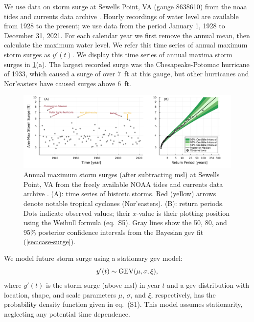 \documentclass{agujournal2019}
\begin{document}
We use data on storm surge at Sewells Point, VA (gauge 8638610) from the \gls{noaa} tides and currents data archive \cite{noaa_tidesandcurrents:2022}.
Hourly recordings of water level are available from 1928 to the present; we use data from the period January 1, 1928 to December 31, 2021.
For each calendar year we first remove the annual mean, then calculate the maximum water level.
We refer this time series of annual maximum storm surges as $y'(t)$.
We display this time series of annual maxima storm surges in \cref{fig:surge-obs-return}(a).
The largest recorded surge was the Chesapeake-Potomac hurricane of 1933, which caused a surge of over \SI{7}{ft} at this gauge, but other hurricanes and Nor'easters have caused surges above \SI{6}{ft}.

\begin{figure}
  \centering
  \includegraphics[width=\textwidth]{surge-obs-return}
  \caption{
    Annual maximum storm surges (after subtracting \acrlong{msl}) at Sewells Point, VA from the freely available NOAA tides and currents data archive \protect\cite{noaa_tidesandcurrents:2022}.
    (A):
    time series of historic storms.
    Red (yellow) arrows denote notable tropical cyclones (Nor'easters).
    (B):
    return periods.
    Dots indicate observed values; their $x$-value is their plotting position using the Weibull formula (eq.~S5).
    Gray lines show the 50, 80, and 95\% posterior confidence intervals from the Bayesian \gls{gev} fit (\cref{sec:case-surge}).
  }\label{fig:surge-obs-return}
\end{figure}

We model future storm surge using a stationary \gls{gev} model:
\begin{equation}\label{eq:surge-model}
  y'(t) \sim \text{GEV}\qty(\mu, \sigma, \xi),
\end{equation}
where $y'(t)$ is the storm surge (above \gls{msl}) in year $t$ and a \gls{gev} distribution with location, shape, and scale parameters $\mu$, $\sigma$, and $\xi$, respectively, has the probability density function given in eq.~(S1).
This model assumes stationarity, neglecting any potential time dependence.
\end{document}
